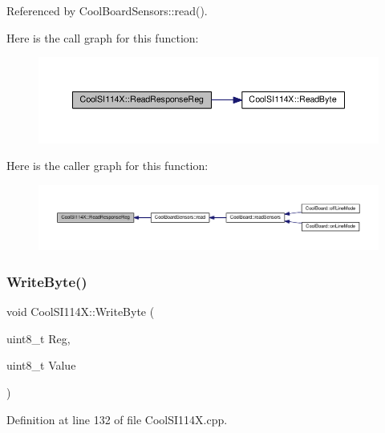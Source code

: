 Referenced by Cool\+Board\+Sensors\+::read().

Here is the call graph for this function\+:\nopagebreak
\begin{figure}[H]
\begin{center}
\leavevmode
\includegraphics[width=350pt]{dd/d67/class_cool_s_i114_x_a869d3825147831d707f7ef324a665646_cgraph}
\end{center}
\end{figure}
Here is the caller graph for this function\+:\nopagebreak
\begin{figure}[H]
\begin{center}
\leavevmode
\includegraphics[width=350pt]{dd/d67/class_cool_s_i114_x_a869d3825147831d707f7ef324a665646_icgraph}
\end{center}
\end{figure}
\mbox{\label{class_cool_s_i114_x_ac5c8dc5ade604da7a1c8cd1586feefc2}} 
\subsubsection{\texorpdfstring{Write\+Byte()}{WriteByte()}}
{\footnotesize\ttfamily void Cool\+S\+I114\+X\+::\+Write\+Byte (\begin{DoxyParamCaption}\item[{uint8\+\_\+t}]{Reg,  }\item[{uint8\+\_\+t}]{Value }\end{DoxyParamCaption})\hspace{0.3cm}{\ttfamily [private]}}



Definition at line 132 of file Cool\+S\+I114\+X.\+cpp.



